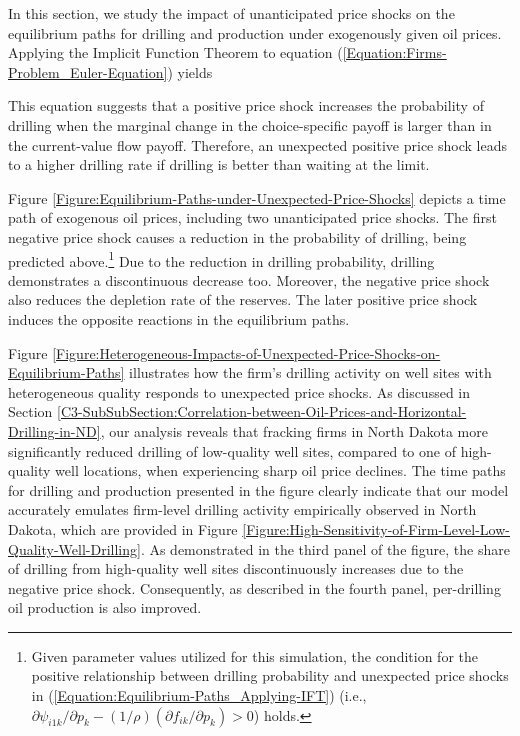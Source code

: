 In this section, we study the impact of unanticipated price shocks on the equilibrium paths for drilling and production under exogenously given oil prices. Applying the Implicit Function Theorem to equation (\ref{Equation:Firms-Problem_Euler-Equation}) yields

This equation suggests that a positive price shock increases the probability of drilling when the marginal change in the choice-specific payoff is larger than in the current-value flow payoff. Therefore, an unexpected positive price shock leads to a higher drilling rate if drilling is better than waiting at the limit. 

Figure \ref{Figure:Equilibrium-Paths-under-Unexpected-Price-Shocks} depicts a time path of exogenous oil prices, including two unanticipated price shocks. The first negative price shock causes a reduction in the probability of drilling, being predicted above.\footnote{Given parameter values utilized for this simulation, the condition for the positive relationship between drilling probability and unexpected price shocks in (\ref{Equation:Equilibrium-Paths_Applying-IFT}) (i.e., $\partial \psi_{i1k} / \partial p_{k} - (1/\rho)(\partial f_{ik} / \partial p_{k}) > 0$) holds.} Due to the reduction in drilling probability, drilling demonstrates a discontinuous decrease too. Moreover, the negative price shock also reduces the depletion rate of the reserves. The later positive price shock induces the opposite reactions in the equilibrium paths. 

Figure \ref{Figure:Heterogeneous-Impacts-of-Unexpected-Price-Shocks-on-Equilibrium-Paths} illustrates how the firm's drilling activity on well sites with heterogeneous quality responds to unexpected price shocks. As discussed in Section \ref{C3-SubSubSection:Correlation-between-Oil-Prices-and-Horizontal-Drilling-in-ND}, our analysis reveals that fracking firms in North Dakota more significantly reduced drilling of low-quality well sites, compared to one of high-quality well locations, when experiencing sharp oil price declines. The time paths for drilling and production presented in the figure clearly indicate that our model accurately emulates firm-level drilling activity empirically observed in North Dakota, which are provided in Figure \ref{Figure:High-Sensitivity-of-Firm-Level-Low-Quality-Well-Drilling}. As demonstrated in the third panel of the figure, the share of drilling from high-quality well sites discontinuously increases due to the negative price shock. Consequently, as described in the fourth panel, per-drilling oil production is also improved. 
